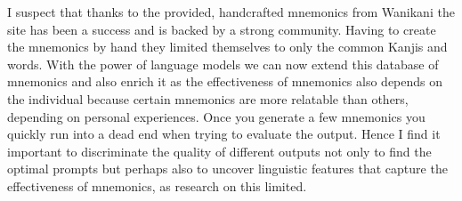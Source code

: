 I suspect that thanks to the provided, handcrafted mnemonics from Wanikani the site has been a success and is backed by a strong community. Having to create the mnemonics by hand they limited themselves to only the common Kanjis and words. With the power of language models we can now extend this database of mnemonics and also enrich it as the effectiveness of mnemonics also depends on the individual because certain mnemonics are more relatable than others, depending on personal experiences. Once you generate a few mnemonics you quickly run into a dead end when trying to evaluate the output. Hence I find it important to discriminate the quality of different outputs not only to find the optimal prompts but perhaps also to uncover linguistic features that capture the effectiveness of mnemonics, as research on this limited. 



